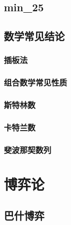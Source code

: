 \documentclass[10pt,a4paper]{article}
\begin{document}
\subsection{min\_25}
\begin{spacing}{1.5}

\end{spacing}

\subsection{数学常见结论}
\subsubsection{插板法}
\begin{spacing}{1.5}

\end{spacing}
\subsubsection{组合数学常见性质}
\begin{spacing}{1.5}

\end{spacing}
\subsubsection{斯特林数}
\begin{spacing}{1.5}

\end{spacing}
\subsubsection{卡特兰数}
\begin{spacing}{1.5}

\end{spacing}
\subsubsection{斐波那契数列}
\begin{spacing}{1.5}

\end{spacing}
\section{博弈论}
\subsection{巴什博弈}
\end{document}
